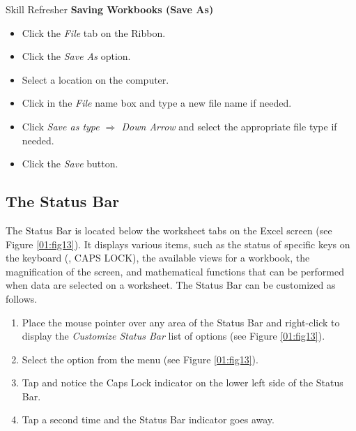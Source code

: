 \begin{center}
	\begin{sklbox}{Skill Refresher}
		\textbf{Saving Workbooks (Save As)}
		\\
		\begin{itemize}
			\setlength{\itemsep}{0pt}
			\setlength{\parskip}{0pt}
			\setlength{\parsep}{0pt}
			
			\item Click the \textit{File} tab on the Ribbon.
			\item Click the \textit{Save As} option.
			\item Select a location on the computer.
			\item Click in the \textit{File} name box and type a new file name if needed.
			\item Click \textit{Save as type $ \Rightarrow $ Down Arrow} and select the appropriate file type if needed.
			\item Click the \textit{Save} button.
		
		\end{itemize}
	\end{sklbox}
\end{center}

\subsection{The Status Bar}

The Status Bar is located below the worksheet tabs on the Excel screen (see Figure \ref{01:fig13}). It displays various items, such as the status of specific keys on the keyboard (\eg, CAPS LOCK), the available views for a workbook, the magnification of the screen, and mathematical functions that can be performed when data are selected on a worksheet. The Status Bar can be customized as follows.

\begin{enumbox}
	\begin{enumerate}
		\item Place the mouse pointer over any area of the Status Bar and right-click to display the \textit{Customize Status Bar} list of options (see Figure \ref{01:fig13}).
		\item Select the  option from the menu (see Figure \ref{01:fig13}).
		\item Tap  and notice the Caps Lock indicator on the lower left side of the Status Bar.
		\item Tap  a second time and the Status Bar indicator goes away.
	\end{enumerate}
\end{enumbox}

